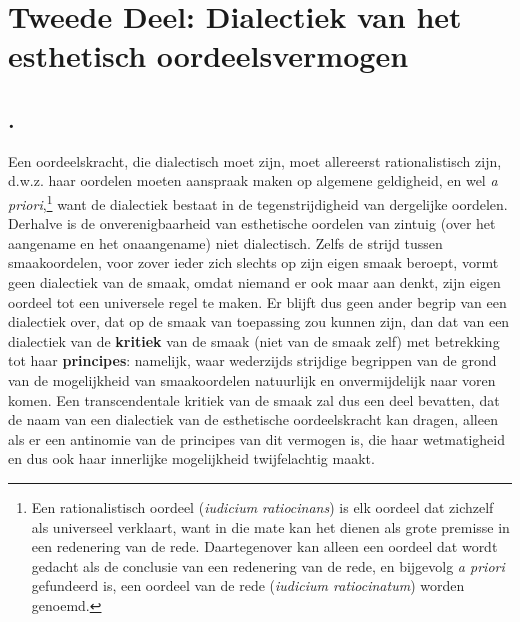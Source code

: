 \chapter{Tweede Deel: Dialectiek van het esthetisch oordeelsvermogen}

\section{.}

Een oordeelskracht, die dialectisch moet zijn, moet allereerst rationalistisch zijn, d.w.z. haar oordelen moeten aanspraak maken op algemene geldigheid, en wel \textit{a priori},\footnote{
Een rationalistisch oordeel (\textit{iudicium ratiocinans}) is elk oordeel dat zichzelf als universeel verklaart, want in die mate kan het dienen als grote premisse in een redenering van de rede. Daartegenover kan alleen een oordeel dat wordt gedacht als de conclusie van een redenering van de rede, en bijgevolg \textit{a priori} gefundeerd is, een oordeel van de rede (\textit{iudicium ratiocinatum}) worden genoemd.} want de dialectiek bestaat in de tegenstrijdigheid van dergelijke oordelen. Derhalve is de onverenigbaarheid van esthetische oordelen van zintuig (over het aangename en het onaangename) niet dialectisch. Zelfs de strijd tussen smaakoordelen, voor zover ieder zich slechts op zijn eigen smaak beroept, vormt geen dialectiek van de smaak, omdat niemand er ook maar aan denkt, zijn eigen oordeel tot een universele regel te maken. Er blijft dus geen ander begrip van een dialectiek over, dat op de smaak van toepassing zou kunnen zijn, dan dat van een dialectiek van de \textbf{kritiek} van de smaak (niet van de smaak zelf) met betrekking tot haar \textbf{principes}: namelijk, waar wederzijds strijdige begrippen van de grond van de mogelijkheid van smaakoordelen natuurlijk en onvermijdelijk naar voren komen. Een transcendentale kritiek van de smaak zal dus een deel bevatten, dat de naam van een dialectiek van de esthetische oordeelskracht kan dragen, alleen als er een antinomie van de principes van dit vermogen is, die haar wetmatigheid en dus ook haar innerlijke mogelijkheid twijfelachtig maakt.


